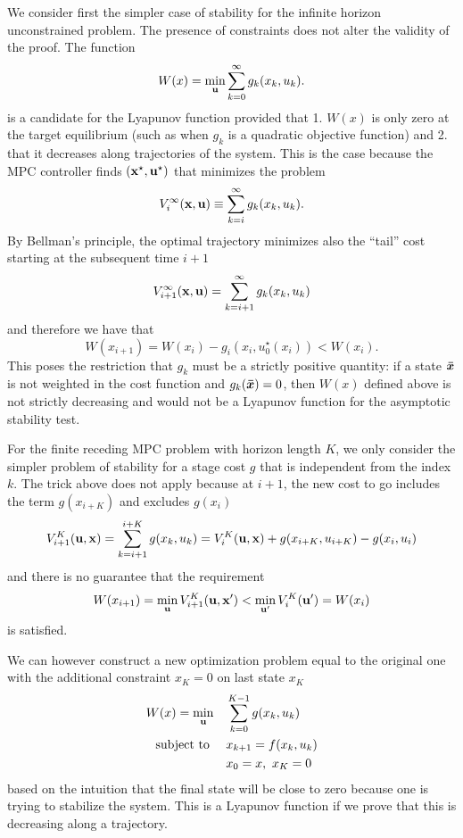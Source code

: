 We consider first the simpler case of stability for the infinite horizon unconstrained problem. The presence of constraints does not alter the validity of the proof. The function
\begin{equation*}
  W(x) = \min_{\boldsymbol{\mathrm{u}}} \sum_{k=0}^\infty g_k(x_k,u_k).
\end{equation*}
is a candidate for the Lyapunov function provided that 1. $W(x)$ is only zero at the target equilibrium (such as when $g_k$ is a quadratic objective function) and 2. that it decreases along trajectories of the system. This is the case because the MPC controller finds $(\boldsymbol{\mathrm{x}}^\star, \boldsymbol{\mathrm{u}}^\star)$ that minimizes the problem
\begin{equation*}
  V^\infty_i(\boldsymbol{\mathrm{x}},\boldsymbol{\mathrm{u}}) \equiv \sum_{k=i}^\infty g_k(x_k,u_k).
\end{equation*}
By Bellman's principle, the optimal trajectory minimizes also the ``tail'' cost starting at the subsequent time $i+1$
\begin{equation*}
  V_{i+1}^\infty(\boldsymbol{\mathrm{x}},\boldsymbol{\mathrm{u}}) = \sum_{k=i+1}^\infty g_k(x_k,u_k)
\end{equation*}
and therefore we have that
\begin{equation*}
  W(x_{i+1}) = W(x_i) - g_i(x_i,u_0^\star(x_i)) < W(x_i).
\end{equation*}
This poses the restriction that $g_k$ must be a strictly positive quantity: if a state $\boldsymbol{\bar{x}}$ is not weighted in the cost function and $g_k(\boldsymbol{\bar{x}})=0$, then $W(x)$ defined above is not strictly decreasing and would not be a Lyapunov function for the asymptotic stability test.

For the finite receding MPC problem with horizon length $K$, we only consider the simpler problem of stability for a stage cost $g$ that is independent from the index $k$. The trick above does not apply because at $i+1$, the new cost to go includes the term $g(x_{i+K})$ and excludes $g(x_i)$
\begin{equation*}
  V^K_{i+1}(\boldsymbol{\mathrm{u}},\boldsymbol{\mathrm{x}}) = \sum_{k=i+1}^{i+K}g(x_k,u_k) = V_i^K(\boldsymbol{\mathrm{u}},\boldsymbol{\mathrm{x}}) + g(x_{i+K},u_{i+K}) - g(x_i,u_i)
\end{equation*}
and there is no guarantee that the requirement
\begin{equation*}
  W(x_{i+1}) = \min_{\boldsymbol{\mathrm{u}}} V^K_{i+1}(\boldsymbol{\mathrm{u}},\boldsymbol{\mathrm{x}}^\prime) < \min_{\boldsymbol{\mathrm{u}}'} V^K_i(\boldsymbol{\mathrm{u}}') = W(x_i)
\end{equation*}
is satisfied.

We can however construct a new optimization problem equal to the original one with the additional constraint $x_K=0$ on last state $x_K$
\begin{equation}
  \label{eq:lyapunov-tracking-MPC}
  \begin{aligned}
    W(x) = \min_{\boldsymbol{\mathrm{u}}} &\quad \sum_{k=0}^{K-1} g(x_k,u_k) \\
    \text{subject to } &\quad x_{k+1} = f(x_k,u_k) \\
                                            &\quad  x_0 = x,\ x_K = 0
  \end{aligned}
\end{equation}
based on the intuition that the final state will be close to zero because one is trying to stabilize the system. This is a Lyapunov function if we prove that this is decreasing along a trajectory.


